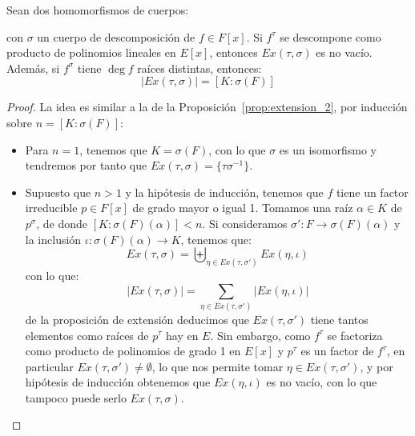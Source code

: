 \begin{prop}\label{prop:extension_3}
    Sean dos homomorfismos de cuerpos:
    \begin{figure}[H]
        \centering
    \end{figure}
    \noindent
    con $\sigma$ un cuerpo de descomposición de $f\in F[x]$. Si $f^\tau$ se descompone como producto de polinomios lineales en $E[x]$, entonces $Ex(\tau,\sigma)$ es no vacío. Además, si $f^\sigma$ tiene $\deg f$ raíces distintas, entonces:
    \begin{equation*}
        |Ex(\tau, \sigma)| = [K:\sigma(F)]
    \end{equation*}
    \begin{proof}
        La idea es similar a la de la Proposición~\ref{prop:extension_2}, por inducción sobre $n=[K:\sigma(F)]$:
        \begin{itemize}
            \item Para $n = 1$, tenemos que $K = \sigma(F)$, con lo que $\sigma$ es un isomorfismo y tendremos por tanto que $Ex(\tau,\sigma) = \{\tau\sigma^{-1}\}$.
            \item Supuesto que $n>1$ y la hipótesis de inducción, tenemos que $f$ tiene un factor irreducible $p\in F[x]$ de grado mayor o igual 1. Tomamos una raíz $\alpha\in K$ de $p^\sigma$, de donde $[K:\sigma(F)(\alpha)]<n$. Si consideramos $\sigma':F\to \sigma(F)(\alpha)$ y la inclusión $\iota:\sigma(F)(\alpha)\to K$, tenemos que:
                \begin{equation*}
                    Ex(\tau,\sigma) = \biguplus_{\eta\in Ex(\tau,\sigma')}Ex(\eta,\iota)
                \end{equation*}
                con lo que:
                \begin{equation*}
                    |Ex(\tau,\sigma)| = \sum_{\eta \in  Ex(\tau, \sigma')}|Ex(\eta,\iota)|
                \end{equation*}
                de la proposición de extensión deducimos que $Ex(\tau,\sigma')$ tiene tantos elementos como raíces de $p^\tau$ hay en $E$. Sin embargo, como $f^\tau$ se factoriza como producto de polinomios de grado 1 en $E[x]$ y $p^\tau$ es un factor de $f^\tau$, en particular $Ex(\tau,\sigma')\neq \emptyset $, lo que nos permite tomar $\eta \in Ex(\tau,\sigma')$, y por hipótesis de inducción obtenemos que $Ex(\eta, \iota)$ es no vacío, con lo que tampoco puede serlo $Ex(\tau,\sigma)$.


\end{itemize}
\end{proof}
\end{prop}
